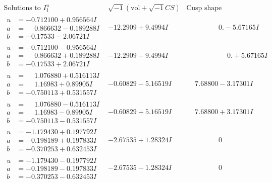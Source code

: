\documentclass[1p]{elsarticle_modified}
\theoremstyle{definition}
\newcommand{\I}{\sqrt{-1}}
\begin{document}
$$\begin{array}{c|c|c}  
\text{Solutions to }I^u_{1}& \I (\text{vol} + \sqrt{-1}CS) & \text{Cusp shape}\\
 \hline 
\begin{aligned}
u &= -0.712100 + 0.956564 I \\
a &= \phantom{-}0.866632 - 0.189288 I \\
b &= -0.17533 - 2.06721 I\end{aligned}
 & -12.2909 + 9.4994 I & \phantom{-0.000000 } 0. - 5.67165 I \\ \hline\begin{aligned}
u &= -0.712100 - 0.956564 I \\
a &= \phantom{-}0.866632 + 0.189288 I \\
b &= -0.17533 + 2.06721 I\end{aligned}
 & -12.2909 - 9.4994 I & \phantom{-0.000000 -}0. + 5.67165 I \\ \hline\begin{aligned}
u &= \phantom{-}1.076880 + 0.516113 I \\
a &= \phantom{-}1.16983 + 0.89905 I \\
b &= -0.750113 + 0.531557 I\end{aligned}
 & -0.60829 - 5.16519 I & \phantom{-}7.68800 - 3.17301 I \\ \hline\begin{aligned}
u &= \phantom{-}1.076880 - 0.516113 I \\
a &= \phantom{-}1.16983 - 0.89905 I \\
b &= -0.750113 - 0.531557 I\end{aligned}
 & -0.60829 + 5.16519 I & \phantom{-}7.68800 + 3.17301 I \\ \hline\begin{aligned}
u &= -1.179430 + 0.197792 I \\
a &= -0.198189 + 0.197833 I \\
b &= -0.370253 + 0.632453 I\end{aligned}
 & -2.67535 + 1.28324 I & \phantom{-0.000000 } 0 \\ \hline\begin{aligned}
u &= -1.179430 - 0.197792 I \\
a &= -0.198189 - 0.197833 I \\
b &= -0.370253 - 0.632453 I\end{aligned}
 & -2.67535 - 1.28324 I & \phantom{-0.000000 } 0 \\ \hline\begin{aligned}

\end{aligned}
\end{array}$$
\end{document}
